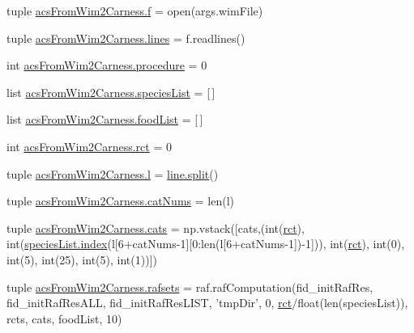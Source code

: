 \begin{DoxyCompactItemize}
\item 
tuple \hyperlink{a00094_ab599c65fad60b9c6ccc220002ce8f89c}{acs\-From\-Wim2\-Carness.\-f} = open(args.\-wim\-File)
\item 
tuple \hyperlink{a00094_a2a83f40b2aa2cbcbd487195fef9af340}{acs\-From\-Wim2\-Carness.\-lines} = f.\-readlines()
\item 
int \hyperlink{a00094_ac84174dad0b933ca88ebdb79cf3497ec}{acs\-From\-Wim2\-Carness.\-procedure} = 0
\item 
list \hyperlink{a00094_aff8baae5d4cd1678204477dd5e620775}{acs\-From\-Wim2\-Carness.\-species\-List} = \mbox{[}$\,$\mbox{]}
\item 
list \hyperlink{a00094_a878da371fd02e9515fe7305e0a57be09}{acs\-From\-Wim2\-Carness.\-food\-List} = \mbox{[}$\,$\mbox{]}
\item 
int \hyperlink{a00094_a61159eb5aec77b97808ce3fb742d8f6d}{acs\-From\-Wim2\-Carness.\-rct} = 0
\item 
tuple \hyperlink{a00094_a0437cd4d2a377ca0e34ab59f4bfd833f}{acs\-From\-Wim2\-Carness.\-l} = \hyperlink{a00070_a4d1aa74fac80ae0275c056575fdb6626}{line.\-split}()
\item 
tuple \hyperlink{a00094_a0d474343423a1a87a760dd91411f96b4}{acs\-From\-Wim2\-Carness.\-cat\-Nums} = len(l)
\item 
tuple \hyperlink{a00094_aea4d714ca7ceaba151380b3aed7c34d8}{acs\-From\-Wim2\-Carness.\-cats} = np.\-vstack(\mbox{[}cats,(int(\hyperlink{a00022_a188d6e4d5a19aaeb1532fc5b9791afba}{rct}), int(\hyperlink{a00054_a0cd6a44ffb07342cbc7e5ac33bfc9495}{species\-List.\-index}(l\mbox{[}6+cat\-Nums-\/1\mbox{]}\mbox{[}0\-:len(l\mbox{[}6+cat\-Nums-\/1\mbox{]})-\/1\mbox{]})), int(\hyperlink{a00022_a188d6e4d5a19aaeb1532fc5b9791afba}{rct}), int(0), int(5), int(25), int(5), int(1))\mbox{]})
\item 
tuple \hyperlink{a00094_a36370edf2a6a4e19f0a99413aac43096}{acs\-From\-Wim2\-Carness.\-rafsets} = raf.\-raf\-Computation(fid\-\_\-init\-Raf\-Res, fid\-\_\-init\-Raf\-Res\-A\-L\-L, fid\-\_\-init\-Raf\-Res\-L\-I\-S\-T, 'tmp\-Dir', 0, \hyperlink{a00022_a188d6e4d5a19aaeb1532fc5b9791afba}{rct}/float(len(species\-List)), rcts, cats, food\-List, 10)
\end{DoxyCompactItemize}
